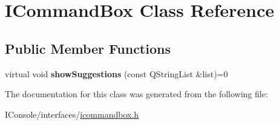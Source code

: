 \hypertarget{class_i_command_box}{\section{I\-Command\-Box Class Reference}
\label{class_i_command_box}
}
\subsection*{Public Member Functions}
\begin{DoxyCompactItemize}
\item 
\hypertarget{class_i_command_box_a2f6e39cddc355cf526e98a2b2884352b}{virtual void {\bfseries show\-Suggestions} (const Q\-String\-List \&list)=0}\label{class_i_command_box_a2f6e39cddc355cf526e98a2b2884352b}

\end{DoxyCompactItemize}


The documentation for this class was generated from the following file\-:\begin{DoxyCompactItemize}
\item 
I\-Console/interfaces/\hyperlink{icommandbox_8h}{icommandbox.\-h}\end{DoxyCompactItemize}
